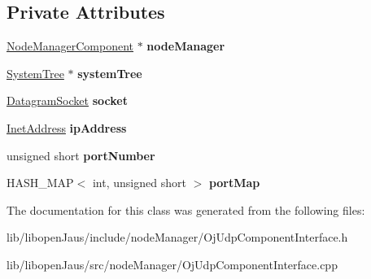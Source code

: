 \subsection*{\-Private \-Attributes}
\begin{DoxyCompactItemize}
\item 
\hypertarget{class_oj_udp_component_interface_ae5801b731bbde2322376715b2836ef21}{\hyperlink{class_node_manager_component}{\-Node\-Manager\-Component} $\ast$ {\bfseries node\-Manager}}\label{class_oj_udp_component_interface_ae5801b731bbde2322376715b2836ef21}

\item 
\hypertarget{class_oj_udp_component_interface_a6217081d4a71d58c99af006010d46d65}{\hyperlink{class_system_tree}{\-System\-Tree} $\ast$ {\bfseries system\-Tree}}\label{class_oj_udp_component_interface_a6217081d4a71d58c99af006010d46d65}

\item 
\hypertarget{class_oj_udp_component_interface_ae844843faa651982a5491808a134ab8d}{\hyperlink{struct_datagram_socket_struct}{\-Datagram\-Socket} {\bfseries socket}}\label{class_oj_udp_component_interface_ae844843faa651982a5491808a134ab8d}

\item 
\hypertarget{class_oj_udp_component_interface_ae0fefb5274e700f4ea920abdf77efa20}{\hyperlink{struct_inet_address_struct}{\-Inet\-Address} {\bfseries ip\-Address}}\label{class_oj_udp_component_interface_ae0fefb5274e700f4ea920abdf77efa20}

\item 
\hypertarget{class_oj_udp_component_interface_a639b234c2d0b86277423cde4da11a637}{unsigned short {\bfseries port\-Number}}\label{class_oj_udp_component_interface_a639b234c2d0b86277423cde4da11a637}

\item 
\hypertarget{class_oj_udp_component_interface_a26a010a2faf3ce1a96eb4be730117df3}{\-H\-A\-S\-H\-\_\-\-M\-A\-P$<$ int, unsigned short $>$ {\bfseries port\-Map}}\label{class_oj_udp_component_interface_a26a010a2faf3ce1a96eb4be730117df3}

\end{DoxyCompactItemize}


\-The documentation for this class was generated from the following files\-:\begin{DoxyCompactItemize}
\item 
lib/libopen\-Jaus/include/node\-Manager/\-Oj\-Udp\-Component\-Interface.\-h\item 
lib/libopen\-Jaus/src/node\-Manager/\-Oj\-Udp\-Component\-Interface.\-cpp\end{DoxyCompactItemize}
